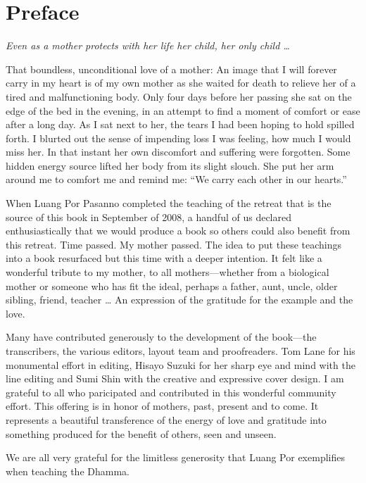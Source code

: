\chapter{Preface}

{\center
\emph{Even as a mother protects with her life her child, her only
child \ldots{}}

}

\vspace{1em}\noindent
That boundless, unconditional love of a mother: An image that I will
forever carry in my heart is of my own mother as she waited for death to
relieve her of a tired and malfunctioning body. Only four days before
her passing she sat on the edge of the bed in the evening, in an attempt
to find a moment of comfort or ease after a long day. As I sat next to
her, the tears I had been hoping to hold spilled forth. I blurted out
the sense of impending loss I was feeling, how much I would miss her. In
that instant her own discomfort and suffering were forgotten. Some
hidden energy source lifted her body from its slight slouch. She put her
arm around me to comfort me and remind me: “We carry each other in our
hearts.”

When Luang Por Pasanno completed the teaching of the retreat that is the
source of this book in September of 2008, a handful of us declared
enthusiastically that we would produce a book so others could also
benefit from this retreat. Time passed. My mother passed. The idea to
put these teachings into a book resurfaced but this time with a deeper
intention. It felt like a wonderful tribute to my mother, to all
mothers—whether from a biological mother or someone who has fit the
ideal, perhaps a father, aunt, uncle, older sibling, friend, teacher \ldots{}
An expression of the gratitude for the example and the love.

Many have contributed generously to the development of the book—the
transcribers, the various editors, layout team and proofreaders. Tom
Lane for his monumental effort in editing, Hisayo Suzuki for her sharp
eye and mind with the line editing and Sumi Shin with the creative and
expressive cover design. I am grateful to all who paricipated and
contributed in this wonderful community effort. This offering is in
honor of mothers, past, present and to come. It represents a beautiful
transference of the energy of love and gratitude into something produced
for the benefit of others, seen and unseen.

We are all very grateful for the limitless generosity that Luang Por
exemplifies when teaching the Dhamma.
